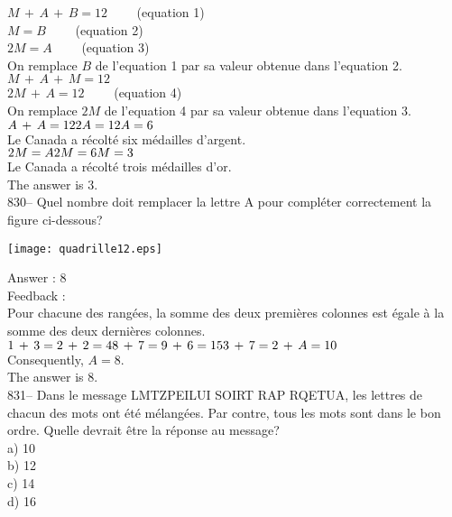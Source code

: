 ﻿\documentclass[letterpaper, 12pt]{article}
\begin{document}
$M\,+\,A\,+\,B=12 \qquad$ (equation 1)\\
$M=B \qquad$ (equation 2)\\
$2M=A \qquad$ (equation 3)\\

On remplace $B$ de l'equation 1 par sa valeur obtenue dans l'equation
2.\\
$M\,+\,A\,+\,M=12$\\
$2M\,+\,A=12 \qquad$ (equation 4)\\

On remplace $2M$ de l'equation 4 par sa valeur obtenue dans l'equation
3.\\
$A\,+\,A=12\\
2A = 12\\
A=6$\\
Le Canada a r\'ecolt\'e six m\'edailles d'argent.\\

$2M=A\\
2M=6\\
M=3$\\
Le Canada a r\'ecolt\'e trois m\'edailles d'or.\\


The answer is 3.\\

830-- Quel nombre doit remplacer la lettre A pour compl\'eter correctement
la figure ci-dessous?\\
    \begin{center}
    \texttt{[image: quadrille12.eps]}
    \end{center}


Answer : 8\\

Feedback : \\
Pour chacune des rang\'ees, la somme des deux premi\`eres colonnes est
\'egale \`a la somme des deux derni\`eres colonnes.\\
$1\,+\,3=2\,+\,2=4\\
8\,+\,7=9\,+\,6=15\\
3\,+\,7=2\,+\,A=10$\\
Consequently, $A=8$.\\
The answer is 8.\\

831-- Dans le message \og LMTZPEILUI SOIRT RAP RQETUA\fg , les
lettres de chacun des mots ont \'et\'e m\'elang\'ees.  Par contre,
tous les mots sont dans le
bon ordre.  Quelle devrait \^etre la r\'eponse au message?\\
a) 10\\
b) 12\\
c) 14\\
d)  16\\
\end{document}
